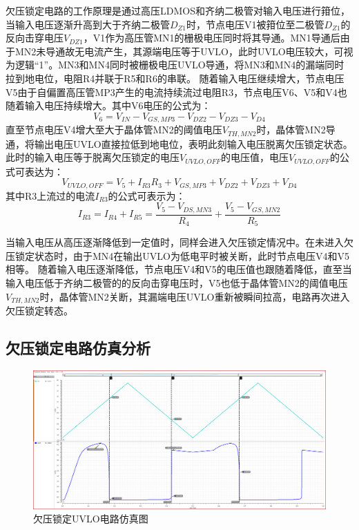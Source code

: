 欠压锁定电路的工作原理是通过高压LDMOS和齐纳二极管对输入电压进行箝位，当输入电压逐渐升高到大于齐纳二极管$D_{Z1}$时，节点电压V1被箝位至二极管$D_{Z1}$的反向击穿电压$V_{DZ1}$，V1作为高压管MN1的栅极电压同时将其导通。MN1导通后由于MN2未导通故无电流产生，其源端电压等于UVLO，此时UVLO电压较大，可视为逻辑“1”。MN3和MN4同时被栅极电压UVLO导通，将MN3和MN4的漏端同时拉到地电位，电阻R4并联于R5和R6的串联。
随着输入电压继续增大，节点电压V5由于自偏置高压管MP3产生的电流持续流过电阻R3，节点电压V6、V5和V4也随着输入电压持续增大。其中V6电压的公式为：
\begin{equation}
    V_6 = V_{IN} - V_{GS,MP3} - V_{DZ2} - V_{DZ3} - V_{D4}  
\end{equation}
直至节点电压V4增大至大于晶体管MN2的阈值电压$V_{TH,MN2}$时，晶体管MN2导通，将输出电压UVLO直接拉低到地电位，表明此刻输入电压脱离欠压锁定状态。此时的输入电压等于脱离欠压锁定的电压$V_{UVLO,OFF}$的电压值，电压$V_{UVLO,OFF}$的公式可表达为：
\begin{equation}
    \label{eq:V_UVLO,OFF公式}
    V_{UVLO,OFF} = V_5 + I_{R3}R_3 + V_{GS,MP3} + V_{DZ2} + V_{DZ3} + V_{D4}  
\end{equation}
其中R3上流过的电流$I_{R3}$的公式可表示为：
\begin{equation}
    \label{eq:IR3公式}
    I_{R3} = I_{R4} + I_{R5} = \frac{V_5 - V_{DS,MN3}}{R_4} +  \frac{V_5 - V_{GS,MN2}}{R_5}
\end{equation}

当输入电压从高压逐渐降低到一定值时，同样会进入欠压锁定情况中。在未进入欠压锁定状态时，由于MN4在输出UVLO为低电平时被关断，此时节点电压V4和V5相等。
随着输入电压逐渐降低，节点电压V4和V5的电压值也跟随着降低，直至当输入电压低于齐纳二极管的的反向击穿电压时，V5也低于晶体管MN2的阈值电压$V_{TH,MN2}$时，晶体管MN2关断，其漏端电压UVLO重新被瞬间拉高，电路再次进入欠压锁定转态。

\subsection{欠压锁定电路仿真分析}

\begin{figure}[htbp] 
    \centering
    \includegraphics[width=0.8\linewidth]{figures/UVLO.png}
    \caption{欠压锁定UVLO电路仿真图}
    \label{fig:UVLO电路仿真}
\end{figure}

